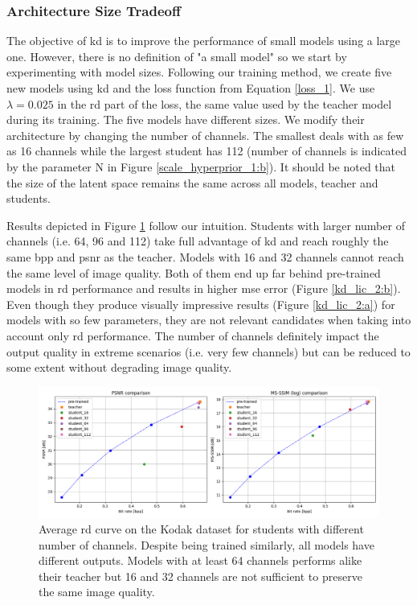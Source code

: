 \documentclass{article}
\begin{document}
\subsubsection{Architecture Size Tradeoff}
\label{architecture_size_tradeoff}
The objective of \acrshort{kd} is to improve the performance of small models using a large one. However, there is no definition of "a small model" so we start by experimenting with model sizes. Following our training method, we create five new models using \acrshort{kd} and the loss function from Equation \ref{loss_1}. We use \(\lambda = 0.025\) in the \acrshort{rd} part of the loss, the same value used by the teacher model during its training. The five models have different sizes. We modify their architecture by changing the number of channels. The smallest deals with as few as 16 channels while the largest student has 112 (number of channels is indicated by the parameter N in Figure \ref{scale_hyperprior_1:b}). It should be noted that the size of the latent space remains the same across all models, teacher and students.

Results depicted in Figure \ref{kd_lic_1} follow our intuition. Students with larger number of channels (i.e. 64, 96 and 112) take full advantage of \acrshort{kd} and reach roughly the same \acrshort{bpp} and \acrshort{psnr} as the teacher. Models with 16 and 32 channels cannot reach the same level of image quality. Both of them end up far behind pre-trained models in \acrshort{rd} performance and results in higher \acrshort{mse} error (Figure \ref{kd_lic_2:b}). Even though they produce visually impressive results (Figure \ref{kd_lic_2:a}) for models with so few parameters, they are not relevant candidates when taking into account only \acrshort{rd} performance. The number of channels definitely impact the output quality in extreme scenarios (i.e. very few channels) but can be reduced to some extent without degrading image quality.

\begin{figure}
    \centering
    \includegraphics[width=15cm]{kd_lic_rd_channels.png}
    \caption[Average \acrshort{rd} curve on the Kodak dataset for students with different number of channels.]{Average \acrshort{rd} curve on the Kodak dataset for students with different number of channels. Despite being trained similarly, all models have different outputs. Models with at least 64 channels performs alike their teacher but 16 and 32 channels are not sufficient to preserve the same image quality.}
    \label{kd_lic_1}
\end{figure}
\end{document}
